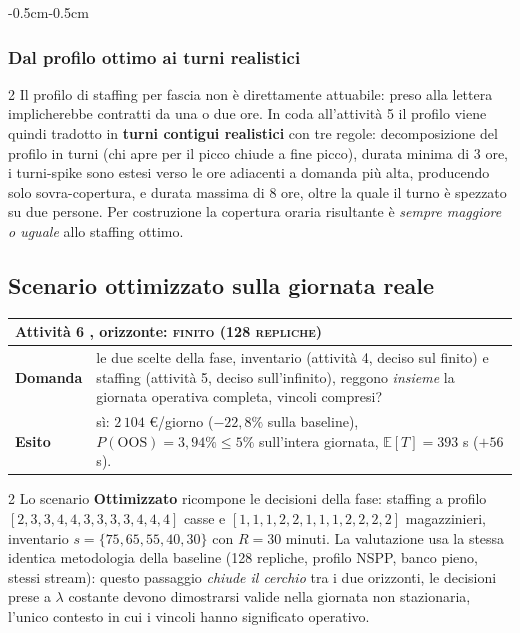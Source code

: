 \documentclass{article}
\newcommand{\schedaattivita}[4]{%
\noindent
{\renewcommand{\arraystretch}{1.25}%
\begin{tabularx}{\linewidth}{|p{2.2cm}|X|}
\hline
\multicolumn{2}{|l|}{\textbf{Attività #1} \;,  \; orizzonte: \textbf{\textsc{#2}}} \\
\hline
\textbf{Domanda} & #3 \\
\hline
\textbf{Esito} & #4 \\
\hline
\end{tabularx}}\par\vspace{6pt}}
\begin{document}
\begin{adjustwidth}{-0.5cm}{-0.5cm}
\subsubsection*{Dal profilo ottimo ai turni realistici}
\begin{multicols}{2}
Il profilo di staffing per fascia non è direttamente attuabile: preso alla lettera implicherebbe
contratti da una o due ore. In coda all'attività 5 il profilo viene quindi tradotto in
\textbf{turni contigui realistici} con tre regole: decomposizione del profilo in turni (chi apre
per il picco chiude a fine picco), durata minima di 3 ore,  i turni-spike sono estesi verso le
ore adiacenti a domanda più alta, producendo solo sovra-copertura,  e durata massima di 8 ore,
oltre la quale il turno è spezzato su due persone. Per costruzione la copertura oraria risultante
è \emph{sempre maggiore o uguale} allo staffing ottimo.

\end{multicols}

\newpage
\subsection{Scenario ottimizzato sulla giornata reale}
\schedaattivita{6}{finito (128 repliche)}%
{le due scelte della fase,  inventario (attività 4, deciso sul finito) e staffing (attività 5,
deciso sull'infinito),  reggono \emph{insieme} la giornata operativa completa, vincoli
compresi?}%
{sì: $2\,104$ \euro/giorno ($-22{,}8\%$ sulla baseline), $P(\text{OOS}) = 3{,}94\% \le 5\%$
sull'intera giornata, $\mathbb{E}[T] = 393$ s ($+56$ s).}
\begin{multicols}{2}
Lo scenario \textbf{Ottimizzato} ricompone le decisioni della fase: staffing a profilo
$[2,3,3,4,4,3,3,3,3,4,4,4]$ casse e $[1,1,1,2,2,1,1,1,2,2,2,2]$ magazzinieri, inventario
$s = \{75,65,55,40,30\}$ con $R = 30$ minuti. La valutazione usa la stessa identica metodologia
della baseline (128 repliche, profilo NSPP, banco pieno, stessi stream): questo passaggio
\emph{chiude il cerchio} tra i due orizzonti,  le decisioni prese a $\lambda$ costante devono
dimostrarsi valide nella giornata non stazionaria, l'unico contesto in cui i vincoli hanno
significato operativo.


\end{multicols}
\end{adjustwidth}
\end{document}
